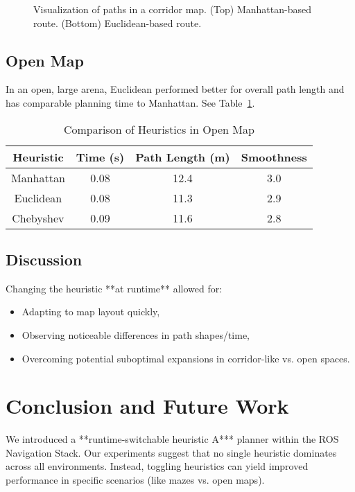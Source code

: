 \documentclass[letterpaper, 10 pt, conference]{ieeeconf}
\begin{document}
\begin{figure}[!ht]
    \centering
    \caption{Visualization of paths in a corridor map. 
    (Top) Manhattan-based route. (Bottom) Euclidean-based route.}
    \label{fig:maze_vis}
\end{figure}

\subsection{Open Map}
In an open, large arena, Euclidean performed better for overall path length 
and has comparable planning time to Manhattan. See Table~\ref{table:open}.

\begin{table}[!ht]
\centering
\footnotesize
\caption{Comparison of Heuristics in Open Map}
\label{table:open}
\begin{tabular}{|c|c|c|c|}
\hline
\textbf{Heuristic} & \textbf{Time (s)} & \textbf{Path Length (m)} & \textbf{Smoothness}\\
\hline
Manhattan & 0.08 & 12.4 & 3.0 \\
Euclidean & 0.08 & 11.3 & 2.9 \\
Chebyshev & 0.09 & 11.6 & 2.8 \\
\hline
\end{tabular}
\end{table}

\subsection{Discussion}
Changing the heuristic **at runtime** allowed for:
\begin{itemize}
    \item Adapting to map layout quickly,
    \item Observing noticeable differences in path shapes/time,
    \item Overcoming potential suboptimal expansions in corridor-like vs. open spaces.
\end{itemize}


\section{Conclusion and Future Work}\label{sec:conclusion}
We introduced a **runtime-switchable heuristic A*** planner within the ROS Navigation 
Stack. Our experiments suggest that no single heuristic dominates across all 
environments. Instead, toggling heuristics can yield improved performance in 
specific scenarios (like mazes vs. open maps).
\end{document}
